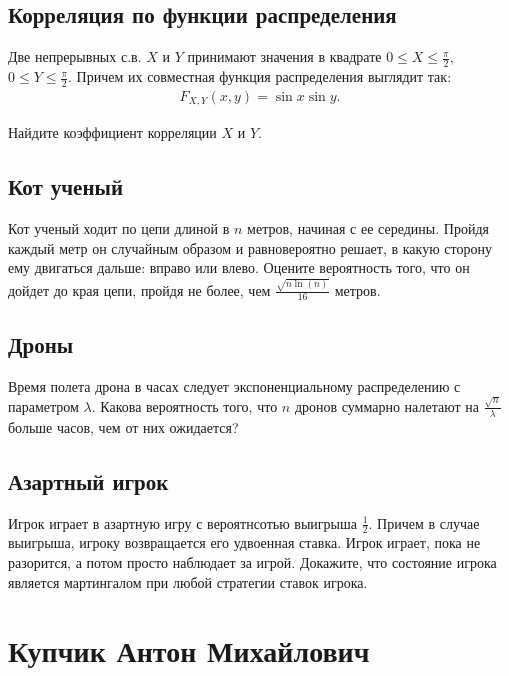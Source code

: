 \documentclass[12pt]{article}
\begin{document}
\subsection{Корреляция по функции распределения}

Две непрерывных с.в. $X$ и $Y$ принимают значения в квадрате $0 \le X \le \frac{\pi}{2},$ $0 \le Y \le \frac{\pi}{2}$. Причем их совместная функция распределения выглядит так:
\begin{align*}
    F_{X, Y} (x, y) = \sin x \sin y.
\end{align*}

Найдите коэффициент корреляции $X$ и $Y$.



\subsection{Кот ученый}

Кот ученый ходит по цепи длиной в $n$ метров, начиная с ее середины. Пройдя каждый метр он случайным образом и равновероятно решает, в какую сторону ему двигаться дальше: вправо или влево. Оцените вероятность того, что он дойдет до края цепи, пройдя не более, чем $\frac{\sqrt{n \ln(n)}}{16}$ метров.



\subsection{Дроны}

Время полета дрона в часах следует экспоненциальному распределению с параметром $\lambda$. Какова вероятность того, что $n$ дронов суммарно налетают на $\frac{\sqrt{n}}{\lambda}$ больше часов, чем от них ожидается?



\subsection{Азартный игрок}

Игрок играет в азартную игру с вероятнсотью выигрыша $\frac{1}{2}$. Причем в случае выигрыша, игроку возвращается его удвоенная ставка. Игрок играет, пока не разорится, а потом просто наблюдает за игрой. Докажите, что состояние игрока является мартингалом при любой стратегии ставок игрока.



\newpage
\section{Купчик Антон Михайлович}
\end{document}
